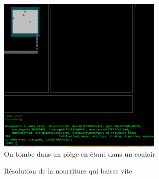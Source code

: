 \documentclass[11pt]{report}
\begin{document}
			\begin{figure}[ht]
				\centering
				\includegraphics[width=8cm]{images/pieges_dans_les_couloirs/wtf.png}
				\caption{On tombe dans un piège en étant dans un couloir}
			\end{figure}

			\begin{figure}[ht]
			    \centering
			    \qquad
			    \caption{Résolution de la nourriture qui baisse vite}%
			\end{figure}		
		
\end{document}
